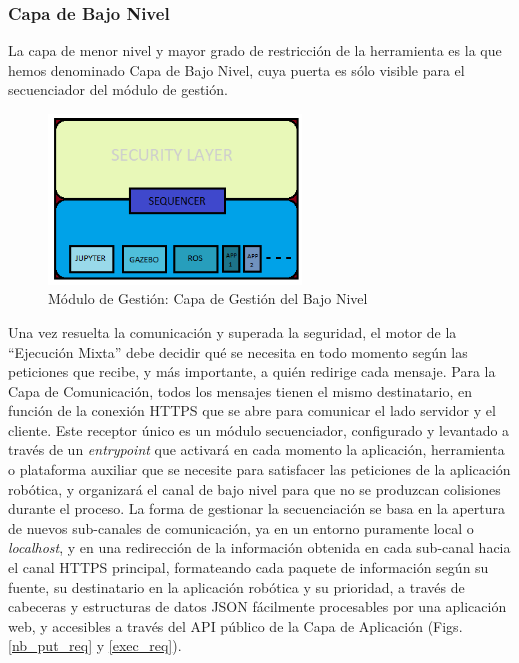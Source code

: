 \subsubsection{Capa de Bajo Nivel}

La capa de menor nivel y mayor grado de restricción de la herramienta es la que hemos denominado Capa de Bajo Nivel, cuya puerta es sólo visible para el secuenciador del módulo de gestión.
\clearpage
\begin{figure}[!hbtp]  \centering\noindent
    \includegraphics[width=0.6\textwidth]{figures/layer1.png}
    \caption{Módulo de Gestión: Capa de Gestión del Bajo Nivel}
    \label{layer1}
\end{figure}

Una vez resuelta la comunicación y superada la seguridad, el motor de la ``Ejecución Mixta'' debe decidir qué se necesita en todo momento según las peticiones que recibe, y más importante, a quién redirige cada mensaje. Para la Capa de Comunicación, todos los mensajes tienen el mismo destinatario, en función de la conexión HTTPS que se abre para comunicar el lado servidor y el cliente. Este receptor único es un módulo secuenciador, configurado y levantado a través de un \textit{entrypoint} que activará en cada momento la aplicación, herramienta o plataforma auxiliar que se necesite para satisfacer las peticiones de la aplicación robótica, y organizará el canal de bajo nivel para que no se produzcan colisiones durante el proceso. La forma de gestionar la secuenciación se basa en la apertura de nuevos sub-canales de comunicación, ya en un entorno puramente local o \textit{localhost}, y en una redirección de la información obtenida en cada sub-canal hacia el canal HTTPS principal, formateando cada paquete de información según su fuente, su destinatario en la aplicación robótica y su prioridad, a través de cabeceras y estructuras de datos JSON fácilmente procesables por una aplicación web, y accesibles a través del API público de la Capa de Aplicación (Figs. \ref{nb_put_req} y \ref{exec_req}).

